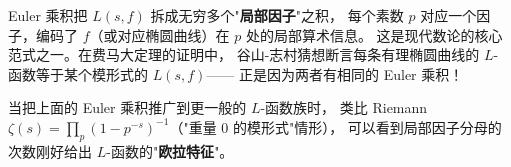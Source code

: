 \begin{remark}
Euler 乘积把 $L(s,f)$ 拆成无穷多个"\textbf{局部因子}"之积，
每个素数 $p$ 对应一个因子，编码了 $f$（或对应椭圆曲线）在 $p$ 处的局部算术信息。
这是现代数论的核心范式之一。在费马大定理的证明中，
谷山-志村猜想断言每条有理椭圆曲线的 $L$-函数等于某个模形式的 $L(s,f)$——
正是因为两者有相同的 Euler 乘积！
\end{remark}

\begin{example}
当把上面的 Euler 乘积推广到更一般的 $L$-函数族时，
类比 Riemann $\zeta(s) = \prod_p (1-p^{-s})^{-1}$（"重量 0 的模形式"情形），
可以看到局部因子分母的次数刚好给出 $L$-函数的"\textbf{欧拉特征}"。
\end{example}
